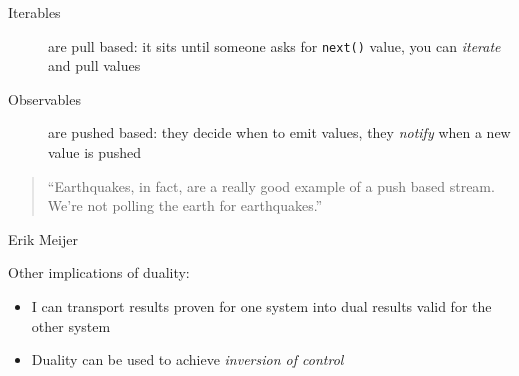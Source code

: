 \documentclass[10pt]{beamer}
\begin{document}
\begin{frame}[fragile]
	\begin{description}
		\item[Iterables] are pull based: it sits until someone asks for \verb|next()| value, you can \emph{iterate} and pull values
		\item[Observables] are pushed based: they decide when to emit values, they \emph{notify} when a new value is pushed
	\end{description}
	\begin{quotation}
		``Earthquakes, in fact, are a really good example of a push based stream. We're not polling the earth for earthquakes.''
	\end{quotation}
	Erik Meijer
\end{frame}


\begin{frame}[fragile]
	Other implications of duality:
	\begin{itemize} 
		\item I can transport results proven for one system into dual results valid for the other system
		\item Duality can be used to achieve \emph{inversion of control}
	\end{itemize}
\end{frame}
\end{document}
